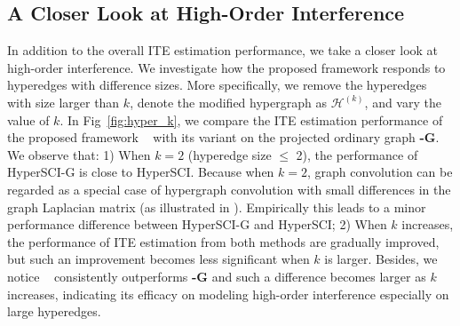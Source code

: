 \vspace{-2mm}
\subsection{A Closer Look at High-Order Interference}
In addition to the overall ITE estimation performance, we take a closer look at high-order interference. %
We investigate how the proposed framework responds to hyperedges with difference sizes. 
More specifically, we remove the hyperedges with size larger than $k$, denote the modified hypergraph as $\mathcal{H}^{(k)}$, and vary the value of $k$. In Fig~\ref{fig:hyper_k}, we compare the ITE estimation performance of the proposed framework \mymodel~ with its variant on the projected ordinary graph \textbf{\mymodel-G}. We observe that: { 1) When $k=2$ (hyperedge size $\le$ 2), the performance of HyperSCI-G is close to HyperSCI. Because when $k=2$, graph convolution can be regarded as a special case of hypergraph convolution with small differences in the graph Laplacian matrix (as illustrated in \cite{bai2021hypergraph}). Empirically this leads to a minor performance difference between HyperSCI-G and HyperSCI;} 2) When $k$ increases, the performance of ITE estimation from both methods are gradually improved, but such an improvement becomes less significant when $k$ is larger. Besides, we notice \mymodel~ consistently outperforms \textbf{\mymodel-G} and such a difference becomes larger as $k$ increases, indicating its efficacy on modeling high-order interference especially on large hyperedges.

